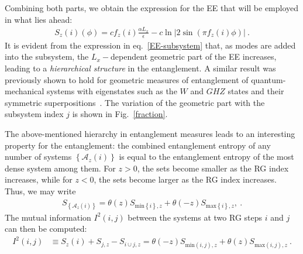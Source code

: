 Combining both parts, we obtain the expression for the EE that will be employed in what lies ahead:
\begin{equation}\begin{aligned}
	\label{EE-subsystem}
	S_{z}(i)(\phi) = c f_{z}(i) \frac{\alpha L_x}{\epsilon} - c\ln \big|2\sin\left(\pi f_{z}(i)\phi\right) \big|~.
\end{aligned}\end{equation}
It is evident from the expression in eq.~\eqref{EE-subsystem} that, as modes are added into the subsystem, the \(L_x-\)dependent geometric part of the EE increases, leading to a {\it hierarchical structure} in the entanglement. A similar result was previously shown to hold for geometric measures of entanglement of quantum-mechanical systems with eigenstates such as the \(W\) and \(GHZ\) states and their symmetric superpositions~\cite{blasone_2008}. The variation of the geometric part with the subsystem index \(j\) is shown in Fig.~\ref{fraction}.

The above-mentioned hierarchy in entanglement measures leads to an interesting property for the entanglement: the combined entanglement entropy of any number of systems \(\left\{ \mathcal{A}_{z}(i) \right\} \) is equal to the entanglement entropy of the most dense system among them. For \(z > 0\), the sets become smaller as the RG index increases, while for \(z < 0\), the sets become larger as the RG index increases. Thus, we may write
\begin{equation}\begin{aligned}\label{ent-union}
	S_{\left\{ \mathcal{A}_{z}(i) \right\}} = \theta(z) S_{\text{min}\left\{ i \right\} ,z} + \theta(-z) S_{\text{max}\left\{ i \right\},z},~.
\end{aligned}\end{equation}
The mutual information \(I^2(i,j)\) between the systems at two RG steps \(i\) and \(j\) can then be computed:
\begin{equation}\begin{aligned}\label{mutinfo}
	I^2(i,j) &\equiv S_{z}(i) + S_{j,z} - S_{i \cup j,z} = \theta(-z) S_{\text{min}(i,j),z} + \theta(z) S_{\text{max}(i,j),z}~.
\end{aligned}\end{equation}

